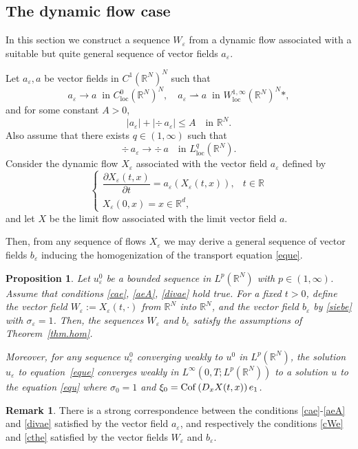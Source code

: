 \documentclass[JEP,XML,SOM,Unicode]{cedram}
\newcommand{\loc}{\mathrm{loc}}
\def \RR {\mathbb R}
\theoremstyle{plain}
\newtheorem{Pro}[Thm]{Proposition}
\theoremstyle{definition}
\newtheorem{Rem}[Thm]{Remark}
\begin{document}
\subsection{The dynamic flow case}\label{ss.flow}
In this section we construct a sequence $W_\varepsilon$ from a dynamic flow associated with a suitable but quite general sequence of vector fields $a_\varepsilon$.

Let $a_\varepsilon,a$ be vector fields in $C^1(\RR^N)^N$ such that
\begin{equation}\label{cae}
a_\varepsilon \to a\;\;\mbox{in }C^0_\loc(\RR^N)^N,\quad a_\varepsilon\rightharpoonup a\;\;\mbox{in }W^{1,\infty}_\loc(\RR^N)^N\ast,
\end{equation}
and for some constant $A>0$,
\begin{equation}\label{aeA}
|a_\varepsilon|+|\div\,a_\varepsilon|\leq A\quad\mbox{in }\RR^N.
\end{equation}
Also assume that there exists $q\in(1,\infty)$ such that
\begin{equation}\label{divae}
\div\,a_\varepsilon\to \div\,a\quad\mbox{in }L^q_\loc(\RR^N).
\end{equation}
Consider the dynamic flow $X_\varepsilon$ associated with the vector field $a_\varepsilon$ defined by
\begin{equation}\label{Xeae}
\begin{cases}
\dfrac{\partial X_\varepsilon(t,x)}{\partial t}=a_\varepsilon(X_\varepsilon(t,x)), & t\in\RR
\\[5pt]
X_\varepsilon(0,x)=x\in\RR^d,
\end{cases}
\end{equation}
and let $X$ be the limit flow associated with the limit vector field $a$.

Then, from any sequence of flows $X_\varepsilon$ we may derive a general sequence of vector fields $b_\varepsilon$ inducing the homogenization of the transport equation \eqref{eque}.
\begin{Pro}\label{pro.ae}
Let $u_\varepsilon^0$ be a bounded sequence in $L^p(\RR^N)$ with $p\in(1,\infty)$.
Assume that conditions \eqref{cae}, \eqref{aeA}, \eqref{divae} hold true. For a fixed $t>0$, define the vector field $W_\varepsilon:=X_\varepsilon(t,\cdot)$ from $\RR^N$ into $\RR^N$, and the vector field $b_\varepsilon$ by \eqref{siebe} with $\sigma_\varepsilon=1$. Then, the sequences $W_\varepsilon$ and $b_\varepsilon$ satisfy the assumptions of Theorem~\ref{thm.hom}.

Moreover, for any sequence $u_\varepsilon^0$ converging weakly to $u^0$ in $L^p(\RR^N)$, the solution $u_\varepsilon$ to equation~\eqref{eque} converges weakly in $L^\infty(0,T;L^p(\RR^N))$ to a solution $u$ to the equation \eqref{equ} where $\sigma_0=1$ and $\xi_0={\rm Cof}\,(D_x X(t,x))\,e_1$.
\end{Pro}
\begin{Rem}
There is a strong correspondence between the conditions \eqref{cae}-\eqref{aeA} and \eqref{divae} satisfied by the vector field $a_\varepsilon$, and respectively the conditions \eqref{cWe} and \eqref{cthe} satisfied by the vector fields $W_\varepsilon$ and $b_\varepsilon$.
\end{Rem}
\end{document}
